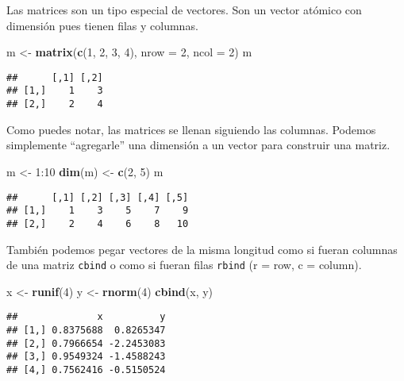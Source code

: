 \documentclass[]{article}
\newenvironment{Shaded}{\begin{snugshade}}{\end{snugshade}}
\newcommand{\KeywordTok}[1]{\textcolor[rgb]{0.13,0.29,0.53}{\textbf{{#1}}}}
\newcommand{\DataTypeTok}[1]{\textcolor[rgb]{0.13,0.29,0.53}{{#1}}}
\newcommand{\DecValTok}[1]{\textcolor[rgb]{0.00,0.00,0.81}{{#1}}}
\newcommand{\StringTok}[1]{\textcolor[rgb]{0.31,0.60,0.02}{{#1}}}
\newcommand{\NormalTok}[1]{{#1}}
\begin{document}
Las matrices son un tipo especial de vectores. Son un vector atómico con
dimensión pues tienen filas y columnas.

\begin{Shaded}
\begin{Highlighting}[]
\NormalTok{m <-}\StringTok{ }\KeywordTok{matrix}\NormalTok{(}\KeywordTok{c}\NormalTok{(}\DecValTok{1}\NormalTok{, }\DecValTok{2}\NormalTok{, }\DecValTok{3}\NormalTok{, }\DecValTok{4}\NormalTok{), }\DataTypeTok{nrow =} \DecValTok{2}\NormalTok{, }\DataTypeTok{ncol =} \DecValTok{2}\NormalTok{)}
\NormalTok{m}
\end{Highlighting}
\end{Shaded}

\begin{verbatim}
##      [,1] [,2]
## [1,]    1    3
## [2,]    2    4
\end{verbatim}

Como puedes notar, las matrices se llenan siguiendo las columnas.
Podemos simplemente ``agregarle'' una dimensión a un vector para
construir una matriz.

\begin{Shaded}
\begin{Highlighting}[]
\NormalTok{m <-}\StringTok{ }\DecValTok{1}\NormalTok{:}\DecValTok{10}
\KeywordTok{dim}\NormalTok{(m) <-}\StringTok{ }\KeywordTok{c}\NormalTok{(}\DecValTok{2}\NormalTok{, }\DecValTok{5}\NormalTok{)}
\NormalTok{m}
\end{Highlighting}
\end{Shaded}

\begin{verbatim}
##      [,1] [,2] [,3] [,4] [,5]
## [1,]    1    3    5    7    9
## [2,]    2    4    6    8   10
\end{verbatim}

También podemos pegar vectores de la misma longitud como si fueran
columnas de una matriz \texttt{cbind} o como si fueran filas
\texttt{rbind} (r = row, c = column).

\begin{Shaded}
\begin{Highlighting}[]
\NormalTok{x <-}\StringTok{ }\KeywordTok{runif}\NormalTok{(}\DecValTok{4}\NormalTok{)}
\NormalTok{y <-}\StringTok{ }\KeywordTok{rnorm}\NormalTok{(}\DecValTok{4}\NormalTok{)}
\KeywordTok{cbind}\NormalTok{(x, y)}
\end{Highlighting}
\end{Shaded}

\begin{verbatim}
##              x          y
## [1,] 0.8375688  0.8265347
## [2,] 0.7966654 -2.2453083
## [3,] 0.9549324 -1.4588243
## [4,] 0.7562416 -0.5150524
\end{verbatim}
\end{document}
